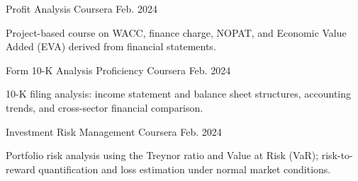 \begin{cventries}
  \cventry
    {Profit Analysis} %
    {Coursera} %
    {} %
    {Feb. 2024} %
    {
      \begin{cvitems}
        \item {Project-based course on WACC, finance charge, NOPAT, and Economic Value Added (EVA) derived from financial statements.}
      \end{cvitems}
    }

  \cventry
    {Form 10-K Analysis Proficiency} %
    {Coursera} %
    {} %
    {Feb. 2024} %
    {
      \begin{cvitems}
        \item {10-K filing analysis: income statement and balance sheet structures, accounting trends, and cross-sector financial comparison.}
      \end{cvitems}
    }

  \cventry
    {Investment Risk Management} %
    {Coursera} %
    {} %
    {Feb. 2024} %
    {
      \begin{cvitems}
        \item {Portfolio risk analysis using the Treynor ratio and Value at Risk (VaR); risk-to-reward quantification and loss estimation under normal market conditions.}
      \end{cvitems}
    }

\end{cventries}
